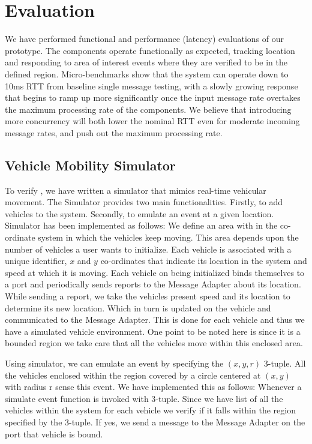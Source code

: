 \section{Evaluation}

We have performed functional and performance (latency) evaluations of
our \name prototype.  The components operate functionally as
expected, tracking location and responding to area of interest events
where they are verified to be in the defined region. Micro-benchmarks
show that the system can operate down to 10ms RTT from baseline single
message testing, with a slowly growing response that begins to ramp up
more significantly once the input message rate overtakes the maximum
processing rate of the components.  We believe that introducing more
concurrency will both lower the nominal RTT even for moderate incoming
message rates, and push out the maximum processing rate.

\subsection{Vehicle Mobility Simulator}

To verify \name, we have written a simulator that mimics real-time
vehicular movement. The Simulator provides two main
functionalities. Firstly, to add vehicles to the system. Secondly, to
emulate an event at a given location. \name Simulator has been
implemented as follows: We define an area with in the co-ordinate
system in which the vehicles keep moving. This area depends upon the
number of vehicles a user wants to initialize. Each vehicle is
associated with a unique identifier, $x$ and $y$ co-ordinates that
indicate its location in the system and speed at which it is
moving. Each vehicle on being initialized binds themselves to a port
and periodically sends reports to the Message Adapter about its
location. While sending a report, we take the vehicles present speed
and its location to determine its new location.  Which in turn is
updated on the vehicle and communicated to the Message Adapter. This
is done for each vehicle and thus we have a simulated vehicle
environment. One point to be noted here is since it is a bounded
region we take care that all the vehicles move within this enclosed
area.

Using simulator, we can emulate an event by specifying the $(x,y,r)$
3-tuple. All the vehicles enclosed within the region covered by a
circle centered at $(x,y)$ with radius r sense this event. We have
implemented this as follows: Whenever a simulate event function is
invoked with 3-tuple. Since we have list of all the vehicles within
the system for each vehicle we verify if it falls within the region
specified by the 3-tuple. If yes, we send a message to the Message
Adapter on the port that vehicle is bound.

